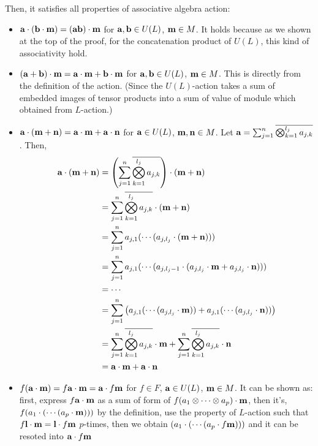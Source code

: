 Then, it satisfies all properties of associative algebra action:
\begin{itemize}
\item
  \(\mathbf{a} \cdot (\mathbf{b} \cdot \mathbf{m}) = (\mathbf{a} \mathbf{b}) \cdot \mathbf{m}\)
  for \(\mathbf{a}, \mathbf{b} \in U(L)\), \(\mathbf{m} \in M\).
  It holds because as we shown at the top of the proof,
  for the concatenation product of \(U(L)\),
  this kind of associativity hold.
\item
  \((\mathbf{a} + \mathbf{b}) \cdot \mathbf{m} = \mathbf{a} \cdot \mathbf{m} + \mathbf{b} \cdot \mathbf{m}\) 
  for \(\mathbf{a}, \mathbf{b} \in U(L)\), \(\mathbf{m} \in M\).
  This is directly from the definition of the action.
  (Since the \(U(L)\)-action takes a sum of embedded images of tensor products
  into a sum of value of module which obtained from \(L\)-action.)
\item
  \(\mathbf{a} \cdot (\mathbf{m} + \mathbf{n}) = \mathbf{a} \cdot \mathbf{m} + \mathbf{a} \cdot \mathbf{n}\) 
  for \(\mathbf{a} \in U(L)\), \(\mathbf{m}, \mathbf{n} \in M\).
  Let \(\mathbf{a} = \sum_{j=1}^{n} \overline{\bigotimes_{k=1}^{l_j} a_{j,k}}\).
  Then,
  \begin{align*}
    \mathbf{a} \cdot (\mathbf{m} + \mathbf{n})
    &= \left(\sum_{j=1}^{n} \overline{\bigotimes_{k=1}^{l_j} a_{j,k}}\right) \cdot (\mathbf{m} + \mathbf{n})
    \\&= \sum_{j=1}^{n} \overline{\bigotimes_{k=1}^{l_j} a_{j,k}} \cdot (\mathbf{m} + \mathbf{n})
    \\&= \sum_{j=1}^{n} a_{j,1} ( \cdots ( a_{j,l_j}\cdot (\mathbf{m} + \mathbf{n}))) 
    \\&= \sum_{j=1}^{n} a_{j,1} ( \cdots ( a_{j,l_j-1} \cdot ( a_{j,l_j} \cdot \mathbf{m} + a_{j,l_j} \cdot \mathbf{n})))
    \\&= \cdots
    \\&= \sum_{j=1}^{n} \left( a_{j,1} ( \cdots ( a_{j,l_j}\cdot \mathbf{m})) + a_{j,1} ( \cdots ( a_{j,l_j}\cdot \mathbf{n}))  \right)
    \\&= \sum_{j=1}^{n} \overline{\bigotimes_{k=1}^{l_j} a_{j,k}}  \cdot \mathbf{m} + \sum_{j=1}^{n} \overline{\bigotimes_{k=1}^{l_j} a_{j,k}} \cdot \mathbf{n}
    \\&= \mathbf{a} \cdot \mathbf{m} + \mathbf{a} \cdot \mathbf{n}
  \end{align*}
\item
  \(f(\mathbf{a} \cdot \mathbf{m}) = f \mathbf{a} \cdot \mathbf{m} = \mathbf{a} \cdot f\mathbf{m}\)
  for \(f \in F\), \(\mathbf{a} \in U(L)\), \(\mathbf{m} \in M\).
  It can be shown as:
  first, express \(f \mathbf{a} \cdot \mathbf{m}\) as a sum of form of
  \(f(a_1 \otimes \cdots \otimes a_p) \cdot \mathbf{m}\),
  then it's,
  \(f(a_1 \cdot (\cdots (a_p \cdot \mathbf{m})))\) by the definition,
  use the property of \(L\)-action such that
  \(f \mathbf{l} \cdot \mathbf{m} = \mathbf{l} \cdot f \mathbf{m}\)
  \(p\)-times,
  then we obtain
  \((a_1 \cdot (\cdots (a_p \cdot f \mathbf{m})))\)
  and it can be resoted into
  \(\mathbf{a} \cdot f\mathbf{m}\)
\end{itemize}

